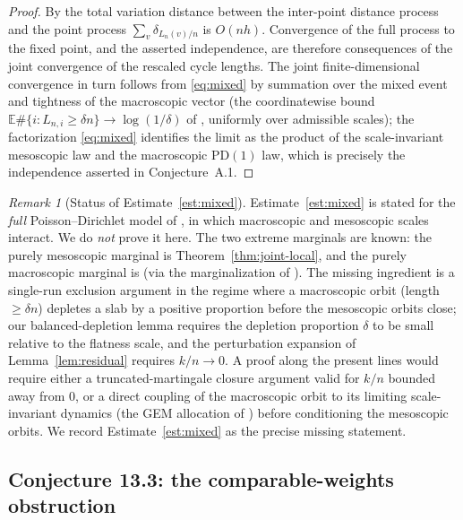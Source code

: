 \documentclass[11pt]{article}
\newcommand{\E}{\mathbb{E}}
\newcommand{\1}{\mathbf{1}}
\newcommand{\PD}{\mathrm{PD}}
\theoremstyle{remark}
\newtheorem{remark}[theorem]{Remark}
\begin{document}
\begin{proof}
By \cite[Lemma~8.2]{Lon26} the total variation distance between the
inter-point distance process and the point process
$\sum_{v}\delta_{L_n(v)/n}$ is $O(nh)$. Convergence of the full process
to the fixed point, and the asserted independence, are therefore
consequences of the joint convergence of the rescaled cycle lengths.
The joint finite-dimensional convergence in turn follows from
\eqref{eq:mixed} by summation over the mixed event and tightness of the
macroscopic vector (the coordinatewise bound
$\E\#\{i:L_{n,i}\ge\delta n\}\to\log(1/\delta)$ of \cite[Proposition~6.14]{Lon26},
uniformly over admissible scales); the factorization
\eqref{eq:mixed} identifies the limit as the product of the
scale-invariant mesoscopic law and the macroscopic $\PD(1)$ law, which
is precisely the independence asserted in Conjecture~A.1.
\end{proof}

\begin{remark}[Status of Estimate~\ref{est:mixed}]\label{rem:est-status}
Estimate~\ref{est:mixed} is stated for the \emph{full} Poisson--Dirichlet
model of \cite[Appendix~A]{Lon26}, in which macroscopic and mesoscopic
scales interact. We do \emph{not} prove it here. The two extreme
marginals are known: the purely mesoscopic marginal is
Theorem~\ref{thm:joint-local}, and the purely macroscopic marginal is
\cite[Theorem~10.1]{Lon26} (via the marginalization of
\cite[Theorem~6.1]{Lon26}). The missing ingredient is a single-run
exclusion argument in the regime where a macroscopic orbit (length
$\ge\delta n$) depletes a slab by a positive proportion before the
mesoscopic orbits close; our balanced-depletion lemma requires the
depletion proportion $\delta$ to be small relative to the flatness
scale, and the perturbation expansion of Lemma~\ref{lem:residual}
requires $k/n\to0$. A proof along the present lines would require
either a truncated-martingale closure argument valid for $k/n$
bounded away from $0$, or a direct coupling of the macroscopic orbit
to its limiting scale-invariant dynamics (the GEM allocation of
\cite[Section~9]{Lon26}) before conditioning the mesoscopic orbits.
We record Estimate~\ref{est:mixed} as the precise missing statement.
\end{remark}

\subsection{Conjecture 13.3: the comparable-weights
obstruction}\label{sec:133}
\end{document}
